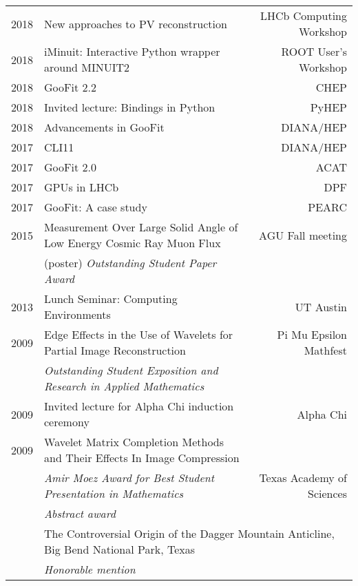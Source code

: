 \documentclass[10pt,letterpaper,english]{moderncv}
\begin{document}
\begin{tabularx}{\textwidth}{p{.35in}Xr}
	
	2018 & New approaches to PV reconstruction & LHCb Computing Workshop \\ %
	2018 & iMinuit: Interactive Python wrapper around MINUIT2 & ROOT User's Workshop \\  %
	2018 & GooFit 2.2 & CHEP \\ %
	2018 & Invited lecture: Bindings in Python & PyHEP  \\
    2018 & Advancements in GooFit & DIANA/HEP \\
	2017 & CLI11 & DIANA/HEP \\
	2017 & GooFit 2.0 & ACAT \\
	2017 & GPUs in LHCb & DPF \\ %
	2017 & GooFit: A case study & PEARC \\
	
	
	2015 & Measurement Over Large Solid Angle of Low Energy Cosmic Ray Muon Flux &  AGU Fall meeting \\
	 & (poster) \emph{Outstanding Student Paper Award} & \\
	 2013 & Lunch Seminar: Computing Environments & UT Austin \\
	 2009 & Edge Effects in the Use of Wavelets for Partial Image Reconstruction & Pi Mu Epsilon Mathfest \\
	 & \emph{Outstanding Student Exposition and Research in Applied Mathematics} & \\
	 
	 2009 & Invited lecture for Alpha Chi induction ceremony & Alpha Chi  \\
	 
	 2009 & Wavelet Matrix Completion Methods and Their Effects In Image Compression &  \\
	  & \emph{Amir Moez Award for Best Student Presentation in Mathematics} & Texas Academy of Sciences \\
	  & \emph{Abstract award} & \\
	  & \multicolumn{2}{l}{The Controversial Origin of the Dagger Mountain Anticline, Big Bend National Park, Texas}  \\
	  & \emph{Honorable mention} & \\
	  
	  

\end{tabularx}
\end{document}
